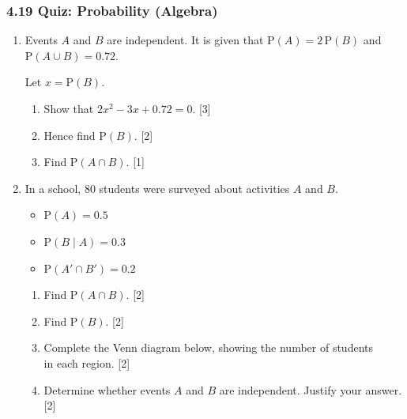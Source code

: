 \documentclass[12pt, twoside]{article}
\begin{document}
\subsubsection*{4.19 Quiz: Probability (Algebra)}

\begin{enumerate}[itemsep=0.15cm]

\item Events $A$ and $B$ are independent. It is given that
      $\mathrm{P}(A) = 2\,\mathrm{P}(B)$ and $\mathrm{P}(A \cup B) = 0.72$.

      Let $x = \mathrm{P}(B)$.

\begin{enumerate}[itemsep=0.1cm]
  \item Show that $2x^{2} - 3x + 0.72 = 0$. \hfill [3]
  \item Hence find $\mathrm{P}(B)$. \hfill [2]
  \item Find $\mathrm{P}(A \cap B)$. \hfill [1]
\end{enumerate}


\newpage

\item In a school, 80 students were surveyed about activities $A$ and $B$.

\begin{itemize}[itemsep=0.1cm]
  \item $\mathrm{P}(A) = 0.5$
  \item $\mathrm{P}(B \mid A) = 0.3$
  \item $\mathrm{P}(A' \cap B') = 0.2$
\end{itemize}

\begin{enumerate}[itemsep=0.1cm]
  \item Find $\mathrm{P}(A \cap B)$. \hfill [2]
  \item Find $\mathrm{P}(B)$. \hfill [2]
  \item Complete the Venn diagram below, showing the number
        of students \\in each region. \hfill [2]
  \item Determine whether events $A$ and $B$ are independent.
        Justify your answer. \hfill [2]
\end{enumerate}


\end{enumerate}
\end{document}
